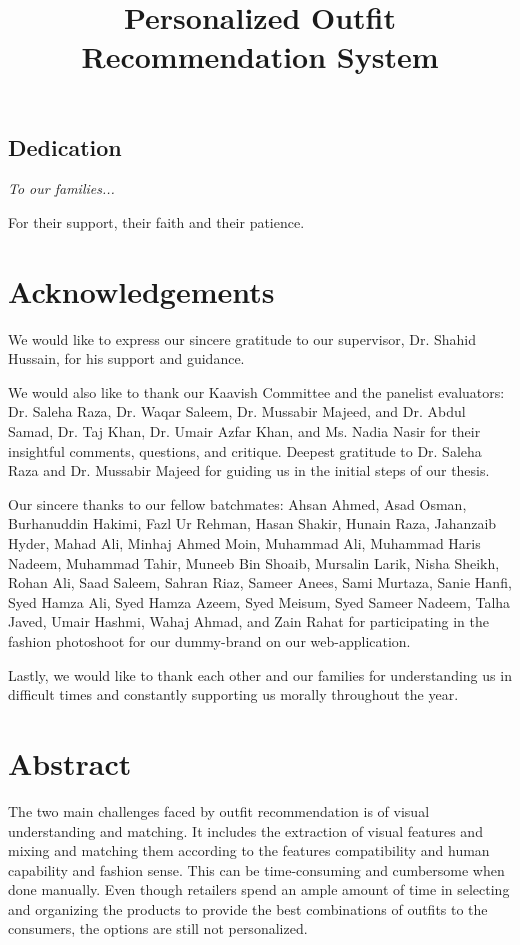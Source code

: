 \documentclass[12pt]{report}
\title{Personalized Outfit Recommendation System}
\begin{document}


\begin{center}
\chapter*{Dedication}
 \textit{To our families...}

For their support, their faith and their patience.
\end{center}

\chapter*{Acknowledgements}
We would like to express our sincere gratitude to our supervisor, Dr. Shahid Hussain, for his support and guidance.\newline 

We would also like to thank our Kaavish Committee and the panelist evaluators: Dr. Saleha Raza, Dr. Waqar Saleem, Dr. Mussabir Majeed, and Dr. Abdul Samad, Dr. Taj Khan, Dr. Umair Azfar Khan, and Ms. Nadia Nasir for their insightful comments, questions, and critique. Deepest gratitude to Dr. Saleha Raza and Dr. Mussabir Majeed for guiding us in the initial steps of our thesis. \newline

Our sincere thanks to our fellow batchmates: Ahsan Ahmed, Asad Osman, Burhanuddin Hakimi, Fazl  Ur Rehman, Hasan Shakir, Hunain Raza,  Jahanzaib Hyder, Mahad Ali, Minhaj Ahmed Moin,  Muhammad Ali, Muhammad Haris Nadeem, Muhammad Tahir, Muneeb Bin Shoaib, Mursalin Larik,  Nisha Sheikh, Rohan Ali, Saad Saleem, Sahran Riaz, Sameer Anees, Sami Murtaza, Sanie Hanfi, Syed Hamza Ali, Syed Hamza Azeem, Syed Meisum, Syed Sameer Nadeem, Talha Javed, Umair Hashmi, Wahaj Ahmad, and Zain Rahat for participating in the fashion photoshoot for our dummy-brand on our web-application.\newline

Lastly, we would like to thank each other and our families for understanding us in difficult times and constantly supporting us morally throughout the year.

\chapter*{Abstract}
The two main challenges faced by outfit recommendation is of visual understanding and matching. It includes the extraction of visual features and mixing and matching them according to the features compatibility and human capability and fashion sense. This can be time-consuming and cumbersome when done manually. Even though retailers spend an ample amount of time in selecting and organizing the products to provide the best combinations of outfits to the consumers, the options are still not personalized. \newline
\end{document}
